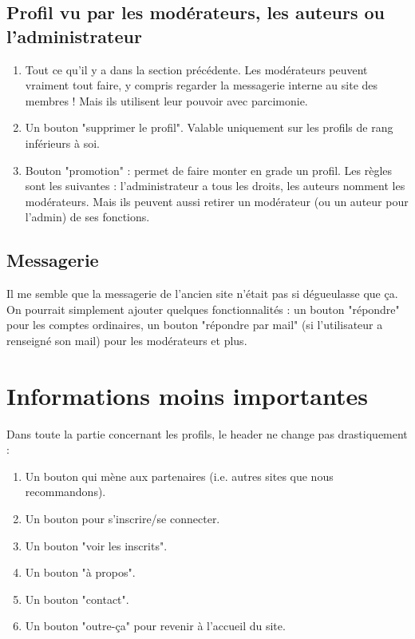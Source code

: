 \documentclass[french]{report}
\theoremstyle{plain}
\begin{document}
		\subsection{Profil vu par les modérateurs, les auteurs ou l'administrateur}
			\begin{enumerate}
				\item Tout ce qu'il y a dans la section précédente. Les modérateurs peuvent vraiment tout faire, y compris regarder la messagerie interne au site des membres ! Mais ils utilisent leur pouvoir avec parcimonie.
				\item Un bouton "supprimer le profil". Valable uniquement sur les profils de rang inférieurs à soi.
				\item Bouton "promotion" : permet de faire monter en grade un profil. Les règles sont les suivantes : l'administrateur a tous les droits, les auteurs nomment les modérateurs. Mais ils peuvent aussi retirer un modérateur (ou un auteur pour l'admin) de ses fonctions. 
			\end{enumerate}

		\subsection{Messagerie}
			Il me semble que la messagerie de l'ancien site n'était pas si dégueulasse que ça. On pourrait simplement ajouter quelques fonctionnalités : un bouton "répondre" pour les comptes ordinaires, un bouton "répondre par mail" (si l'utilisateur a renseigné son mail) pour les modérateurs et plus. 

	\section{Informations moins importantes}

		Dans toute la partie concernant les profils, le header ne change pas drastiquement :
		\begin{enumerate}
			\item Un bouton qui mène aux partenaires (i.e. autres sites que nous recommandons).
			\item Un bouton pour s'inscrire/se connecter.
			\item Un bouton "voir les inscrits".			
			\item Un bouton "à propos".
			\item Un bouton "contact".
			\item Un bouton "outre-ça" pour revenir à l'accueil du site.
		\end{enumerate}
\end{document}
